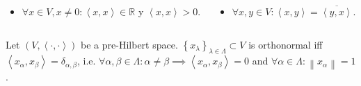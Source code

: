 \begin{frame}
\begin{definition}
		\begin{columns}
			\begin{column}{0.48\textwidth}
				\begin{itemize}
					\item

					      \begin{math}
						      \forall x\in V,x\neq0:
						      \left\langle x,x\right\rangle\in\mathds{R}
					      \end{math}
					      y
					      \begin{math}
						      \left\langle x,x\right\rangle>0
					      \end{math}.
				\end{itemize}
			\end{column}
			\begin{column}{0.48\textwidth}
				\begin{itemize}
					\item

					      \begin{math}
						      \forall x,y\in V:
						      \left\langle x,y\right\rangle=
						      \overline{\left\langle y,x\right\rangle}
					      \end{math}.
				\end{itemize}
			\end{column}
		\end{columns}
	\end{definition}

	\begin{definition}
		Let
		\begin{math}
			\left(
			V,
			\left\langle\cdot,\cdot\right\rangle
			\right)
		\end{math}
		be a pre-Hilbert space.
		\begin{math}
			\left\{
			x_{\lambda}
			\right\}_{\lambda\in\Lambda}\subset V
		\end{math}
		is \alert{orthonormal} iff
		\begin{math}
			\left\langle x_{\alpha},x_{\beta}\right\rangle=
			\delta_{\alpha,\beta}
		\end{math},
		i.e.
		\begin{math}
			\forall\alpha,\beta\in\Lambda:
			\alpha\neq\beta\implies
			\left\langle x_{\alpha},x_{\beta}\right\rangle=0
		\end{math}
		and
		\begin{math}
			\forall\alpha\in\Lambda:
			\left\|x_{\alpha}\right\|=
			1
		\end{math}.
	\end{definition}
\end{frame}